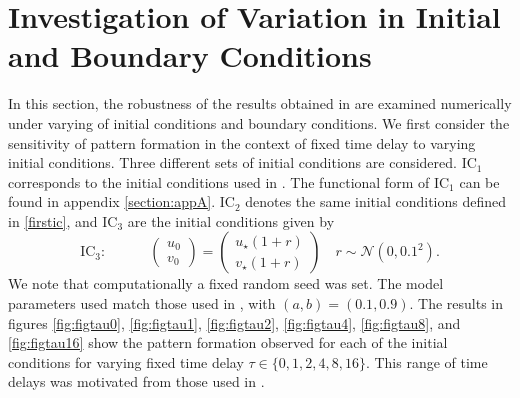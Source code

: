 \section{Investigation of Variation in Initial and Boundary Conditions}
In this section, the robustness of the results obtained in \cite{gaffmonk} are examined numerically under varying of initial conditions and boundary conditions. We first consider the sensitivity of pattern formation in the context of fixed time delay to varying initial conditions. Three different sets of initial conditions are considered. $\text{IC}_1$ corresponds to the initial conditions used in \cite{gaffmonk}. The functional form of $\text{IC}_1$ can be found in appendix \ref{section:appA}. $\text{IC}_2$ denotes the same initial conditions defined in \eqref{firstic}, and $\text{IC}_3$ are the initial conditions given by
\begin{equation}\label{ic3}
\text{IC}_3:\quad\quad\quad\begin{pmatrix}u_0\\v_0\end{pmatrix}=\begin{pmatrix}u_\star(1+r)\\v_\star(1+r)\end{pmatrix}\quad r\sim\mathcal{N}\left(0,0.1^2\right).
\end{equation}
We note that computationally a fixed random seed was set. The model parameters used match those used in \cite{gaffmonk}, with $(a,b)=(0.1,0.9)$. The results in figures \ref{fig:figtau0}, \ref{fig:figtau1}, \ref{fig:figtau2}, \ref{fig:figtau4}, \ref{fig:figtau8}, and \ref{fig:figtau16} show the pattern formation observed for each of the initial conditions for varying fixed time delay $\tau\in\{0,1,2,4,8,16 \}$. This range of time delays was motivated from those used in \cite{gaffmonk}.

